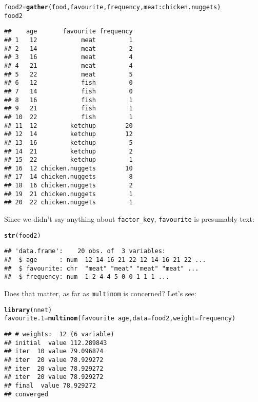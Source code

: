 \documentclass{article}\usepackage[]{graphicx}\usepackage[]{color}
\makeatletter
\newcommand{\hlopt}[1]{\textcolor[rgb]{0,0,0}{#1}}%
\newcommand{\hlstd}[1]{\textcolor[rgb]{0.345,0.345,0.345}{#1}}%
\newcommand{\hlkwb}[1]{\textcolor[rgb]{0.69,0.353,0.396}{#1}}%
\newcommand{\hlkwc}[1]{\textcolor[rgb]{0.333,0.667,0.333}{#1}}%
\newcommand{\hlkwd}[1]{\textcolor[rgb]{0.737,0.353,0.396}{\textbf{#1}}}%
\newenvironment{kframe}{%
 \def\at@end@of@kframe{}%
 \ifinner\ifhmode%
  \def\at@end@of@kframe{\end{minipage}}%
  \begin{minipage}{\columnwidth}%
 \fi\fi%
 \def\FrameCommand##1{\hskip\@totalleftmargin \hskip-\fboxsep
 \colorbox{shadecolor}{##1}\hskip-\fboxsep
     \hskip-\linewidth \hskip-\@totalleftmargin \hskip\columnwidth}%
 \MakeFramed {\advance\hsize-\width
   \@totalleftmargin\z@ \linewidth\hsize
   \@setminipage}}%
 {\par\unskip\endMakeFramed%
 \at@end@of@kframe}
\newenvironment{knitrout}{}{} %
\makeatother
\begin{document}
\begin{knitrout}
\color{fgcolor}\begin{kframe}
\begin{alltt}
\hlstd{food2}\hlkwb{=}\hlkwd{gather}\hlstd{(food,favourite,frequency,meat}\hlopt{:}\hlstd{chicken.nuggets)}
\hlstd{food2}
\end{alltt}
\begin{verbatim}
##    age       favourite frequency
## 1   12            meat         1
## 2   14            meat         2
## 3   16            meat         4
## 4   21            meat         4
## 5   22            meat         5
## 6   12            fish         0
## 7   14            fish         0
## 8   16            fish         1
## 9   21            fish         1
## 10  22            fish         1
## 11  12         ketchup        20
## 12  14         ketchup        12
## 13  16         ketchup         5
## 14  21         ketchup         2
## 15  22         ketchup         1
## 16  12 chicken.nuggets        10
## 17  14 chicken.nuggets         8
## 18  16 chicken.nuggets         2
## 19  21 chicken.nuggets         1
## 20  22 chicken.nuggets         1
\end{verbatim}
\end{kframe}
\end{knitrout}

Since we didn't say anything about \verb-factor_key-,
\texttt{favourite} is presumably text:

\begin{knitrout}
\color{fgcolor}\begin{kframe}
\begin{alltt}
\hlkwd{str}\hlstd{(food2)}
\end{alltt}
\begin{verbatim}
## 'data.frame':	20 obs. of  3 variables:
##  $ age      : num  12 14 16 21 22 12 14 16 21 22 ...
##  $ favourite: chr  "meat" "meat" "meat" "meat" ...
##  $ frequency: num  1 2 4 4 5 0 0 1 1 1 ...
\end{verbatim}
\end{kframe}
\end{knitrout}

Does that matter, as far as \texttt{multinom} is concerned? Let's see:

\begin{knitrout}
\color{fgcolor}\begin{kframe}
\begin{alltt}
\hlkwd{library}\hlstd{(nnet)}
\hlstd{favourite.1}\hlkwb{=}\hlkwd{multinom}\hlstd{(favourite}\hlopt{~}\hlstd{age,}\hlkwc{data}\hlstd{=food2,}\hlkwc{weight}\hlstd{=frequency)}
\end{alltt}
\begin{verbatim}
## # weights:  12 (6 variable)
## initial  value 112.289843 
## iter  10 value 79.096874
## iter  20 value 78.929272
## iter  20 value 78.929272
## iter  20 value 78.929272
## final  value 78.929272 
## converged
\end{verbatim}
\end{kframe}
\end{knitrout}
\end{document}
